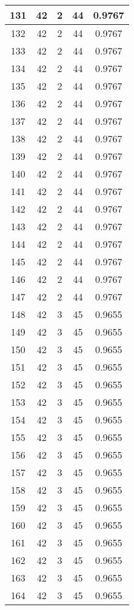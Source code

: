 \documentclass[letterpaper, 12pt]{article}
\begin{document}
\begin{longtable}{|c|c|c|c|c|}
\hline
131 & 42 & 2 & 44 & 0.9767 \\
\hline
132 & 42 & 2 & 44 & 0.9767 \\
\hline
133 & 42 & 2 & 44 & 0.9767 \\
\hline
134 & 42 & 2 & 44 & 0.9767 \\
\hline
135 & 42 & 2 & 44 & 0.9767 \\
\hline
136 & 42 & 2 & 44 & 0.9767 \\
\hline
137 & 42 & 2 & 44 & 0.9767 \\
\hline
138 & 42 & 2 & 44 & 0.9767 \\
\hline
139 & 42 & 2 & 44 & 0.9767 \\
\hline
140 & 42 & 2 & 44 & 0.9767 \\
\hline
141 & 42 & 2 & 44 & 0.9767 \\
\hline
142 & 42 & 2 & 44 & 0.9767 \\
\hline
143 & 42 & 2 & 44 & 0.9767 \\
\hline
144 & 42 & 2 & 44 & 0.9767 \\
\hline
145 & 42 & 2 & 44 & 0.9767 \\
\hline
146 & 42 & 2 & 44 & 0.9767 \\
\hline
147 & 42 & 2 & 44 & 0.9767 \\
\hline
148 & 42 & 3 & 45 & 0.9655 \\
\hline
149 & 42 & 3 & 45 & 0.9655 \\
\hline
150 & 42 & 3 & 45 & 0.9655 \\
\hline
151 & 42 & 3 & 45 & 0.9655 \\
\hline
152 & 42 & 3 & 45 & 0.9655 \\
\hline
153 & 42 & 3 & 45 & 0.9655 \\
\hline
154 & 42 & 3 & 45 & 0.9655 \\
\hline
155 & 42 & 3 & 45 & 0.9655 \\
\hline
156 & 42 & 3 & 45 & 0.9655 \\
\hline
157 & 42 & 3 & 45 & 0.9655 \\
\hline
158 & 42 & 3 & 45 & 0.9655 \\
\hline
159 & 42 & 3 & 45 & 0.9655 \\
\hline
160 & 42 & 3 & 45 & 0.9655 \\
\hline
161 & 42 & 3 & 45 & 0.9655 \\
\hline
162 & 42 & 3 & 45 & 0.9655 \\
\hline
163 & 42 & 3 & 45 & 0.9655 \\
\hline
164 & 42 & 3 & 45 & 0.9655 \\

\end{longtable}
\end{document}

